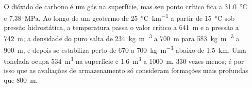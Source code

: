O dióxido de carbono é um gás na superfície, mas seu ponto crítico fica a \qty{31.0}{\celsius} e
\qty{7.38}{MPa}. Ao longo de um geotermo de \qty{25}{\celsius\per\km} a partir de \qty{15}{\celsius} sob
pressão hidrostática, a temperatura passa o valor crítico a \qty{641}{m} e a pressão a
\qty{742}{m}; a densidade do  puro salta de \qty{234}{kg.m^{-3}} a \qty{700}{m} para
\qty{583}{kg.m^{-3}} a \qty{900}{m}, e depois se estabiliza perto de 670 a \qty{700}{kg.m^{-3}} abaixo de
\qty{1.5}{km}. Uma tonelada ocupa \qty{534}{m^3} na superfície e \qty{1.6}{m^3} a \qty{1000}{m},
330 vezes menos; é por isso que as avaliações de armazenamento só consideram formações mais profundas que
\qty{800}{m}.


